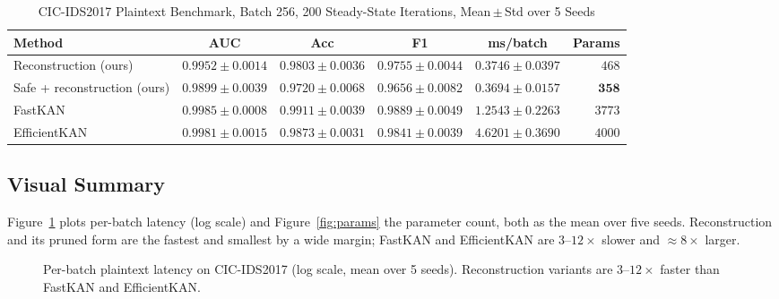 \documentclass[conference]{IEEEtran}
\begin{document}
\begin{table}[t]
\caption{CIC-IDS2017 Plaintext Benchmark, Batch 256, 200 Steady-State
Iterations, Mean\,$\pm$\,Std over 5 Seeds}
\label{tab:latency}
\centering
\footnotesize
\begin{tabular}{lccccr}
\toprule
Method & AUC & Acc & F1 & ms/batch & Params\\
\midrule
Reconstruction (ours) & $0.9952\pm0.0014$ & $0.9803\pm0.0036$
& $0.9755\pm0.0044$ & $0.3746\pm0.0397$ & $468$\\
Safe + reconstruction (ours) & $0.9899\pm0.0039$ & $0.9720\pm0.0068$
& $0.9656\pm0.0082$ & $\mathbf{0.3694\pm0.0157}$ & $\mathbf{358}$\\
FastKAN~\cite{fastkan} & $\mathbf{0.9985\pm0.0008}$ & $\mathbf{0.9911\pm0.0039}$
& $\mathbf{0.9889\pm0.0049}$ & $1.2543\pm0.2263$ & $3773$\\
EfficientKAN~\cite{effkan} & $0.9981\pm0.0015$ & $0.9873\pm0.0031$
& $0.9841\pm0.0039$ & $4.6201\pm0.3690$ & $4000$\\
\bottomrule
\end{tabular}
\end{table}

\subsection{Visual Summary}

Figure~\ref{fig:speed} plots per-batch latency (log scale) and
Figure~\ref{fig:params} the parameter count, both as the mean over five seeds.
Reconstruction and its pruned form are the fastest and smallest by a wide
margin; FastKAN and EfficientKAN are $3$--$12\times$ slower and $\approx8\times$
larger.

\begin{figure}[t]
\centering
{}
\caption{Per-batch plaintext latency on CIC-IDS2017 (log scale, mean over 5
seeds). Reconstruction variants are $3$--$12\times$ faster than FastKAN and
EfficientKAN.}
\label{fig:speed}
\end{figure}
\end{document}
